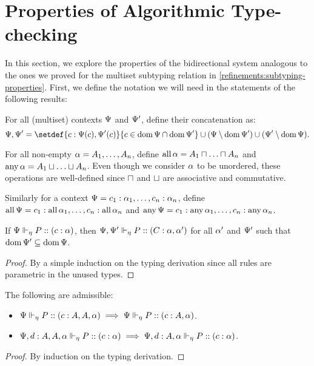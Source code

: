
\section{Properties of Algorithmic Type-checking}

In this section, we explore the properties of the bidirectional system analogous to the ones we proved for the multiset subtyping relation in \cref{refinements:subtyping-properties}. First, we define the notation we will need in the statements of the following results:

\begin{definition}
  For all (multiset) contexts $\Psi$ and $\Psi'$, define their concatenation as:
  $$
  \ctx, \ctx' = \setdef{c : \lookup \ctx c, \lookup {\ctx'} c}{c \in \dom\ctx \cap \dom{\ctx'}} \cup \parens{\ctx \setminus \dom{\ctx'}} \cup \parens{\ctx' \setminus \dom{\ctx}}.
  $$
\end{definition}

\begin{definition}
  For all non-empty $\alpha = A_1, \ldots, A_n$, define $\operatorname{all} \alpha = A_1 \mathbin{\sqcap} \ldots \mathbin{\sqcap} A_n$ and $\operatorname{any} \alpha = A_1 \mathbin{\sqcup} \ldots \mathbin{\sqcup} A_n$. Even though we consider $\alpha$ to be unordered, these operations are well-defined since $\mathbin{\sqcap}$ and $\mathbin{\sqcup}$ are associative and commutative.

  Similarly for a context $\Psi = c_1 : \alpha_1, \ldots, c_n : \alpha_n$, define $\operatorname{all} \Psi = c_1 : \operatorname{all} {\alpha_1}, \ldots, c_n : \operatorname{all} {\alpha_n}$ and $\operatorname{any} \Psi = c_1 : \operatorname{any} {\alpha_1}, \ldots, c_n : \operatorname{any} {\alpha_n}$.
\end{definition}


\begin{lemma}[Weakening]
  If ${\Psi} \Vdash_{\eta} P :: (c : \alpha)$, then ${\Psi, \Psi'} \Vdash_{\eta} P :: (C : \alpha, \alpha')$ for all $\alpha'$ and $\Psi'$ such that $\operatorname{dom}{\Psi'} \subseteq \operatorname{dom}\Psi$.
\end{lemma}
\begin{proof}
  By a simple induction on the typing derivation since all rules are parametric in the unused types.
\end{proof}

\begin{lemma}[Contraction]
  The following are admissible:
  \begin{itemize}
    \item ${\Psi} \Vdash_{\eta} P :: (c : A, A, \alpha) \implies {\Psi} \Vdash_{\eta} P :: (c : A, \alpha)$.
    \item ${\Psi, d : A, A, \alpha} \Vdash_{\eta} P :: (c : \alpha) \implies {\Psi, d : A, \alpha} \Vdash_{\eta} P :: (c : \alpha)$.
  \end{itemize}
\end{lemma}
\begin{proof}
  By induction on the typing derivation.
\end{proof}

